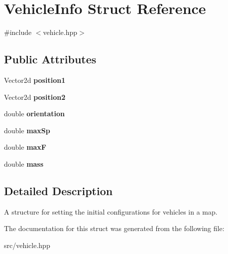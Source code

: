 \hypertarget{structVehicleInfo}{}\section{Vehicle\+Info Struct Reference}
\label{structVehicleInfo}


{\ttfamily \#include $<$vehicle.\+hpp$>$}

\subsection*{Public Attributes}
\begin{DoxyCompactItemize}
\item 
\hypertarget{structVehicleInfo_ab9d63eb653459385a027ee308e995ed4}{}\label{structVehicleInfo_ab9d63eb653459385a027ee308e995ed4} 
Vector2d {\bfseries position1}
\item 
\hypertarget{structVehicleInfo_a2ff369facb2f93ee770bdedad85fd734}{}\label{structVehicleInfo_a2ff369facb2f93ee770bdedad85fd734} 
Vector2d {\bfseries position2}
\item 
\hypertarget{structVehicleInfo_a0ed3789a6f9a444395bd23bc13793e0a}{}\label{structVehicleInfo_a0ed3789a6f9a444395bd23bc13793e0a} 
double {\bfseries orientation}
\item 
\hypertarget{structVehicleInfo_aa9161f00b5082bdc903cdfbf708ee7cb}{}\label{structVehicleInfo_aa9161f00b5082bdc903cdfbf708ee7cb} 
double {\bfseries max\+Sp}
\item 
\hypertarget{structVehicleInfo_a0f1cb051100bbd38c0e5e99dfb3dd149}{}\label{structVehicleInfo_a0f1cb051100bbd38c0e5e99dfb3dd149} 
double {\bfseries maxF}
\item 
\hypertarget{structVehicleInfo_a56d7d3b9a791542e3765303e0007e2fc}{}\label{structVehicleInfo_a56d7d3b9a791542e3765303e0007e2fc} 
double {\bfseries mass}
\end{DoxyCompactItemize}


\subsection{Detailed Description}
A structure for setting the initial configurations for vehicles in a map. 

The documentation for this struct was generated from the following file\+:\begin{DoxyCompactItemize}
\item 
src/vehicle.\+hpp\end{DoxyCompactItemize}
